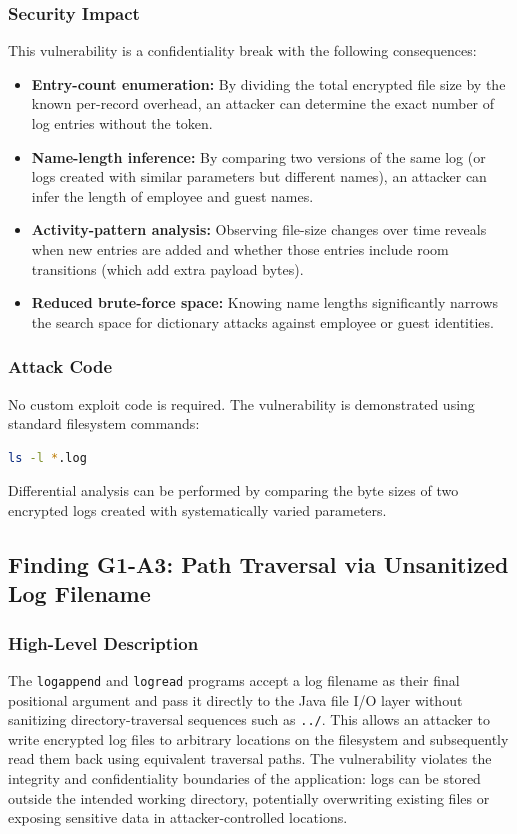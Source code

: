 \documentclass[a4paper, 12pt]{article}
\begin{document}
    \subsubsection{Security Impact}
    This vulnerability is a confidentiality break with the following consequences:
    \begin{itemize}
        \item \textbf{Entry-count enumeration:} By dividing the total encrypted file size by the known per-record overhead, an attacker can determine the exact number of log entries without the token.
        \item \textbf{Name-length inference:} By comparing two versions of the same log (or logs created with similar parameters but different names), an attacker can infer the length of employee and guest names.
        \item \textbf{Activity-pattern analysis:} Observing file-size changes over time reveals when new entries are added and whether those entries include room transitions (which add extra payload bytes).
        \item \textbf{Reduced brute-force space:} Knowing name lengths significantly narrows the search space for dictionary attacks against employee or guest identities.
    \end{itemize}

    \subsubsection{Attack Code}
    No custom exploit code is required. The vulnerability is demonstrated using standard filesystem commands:
    \begin{lstlisting}[language=bash]
ls -l *.log
    \end{lstlisting}
    Differential analysis can be performed by comparing the byte sizes of two encrypted logs created with systematically varied parameters.

    \subsection{Finding G1-A3: Path Traversal via Unsanitized Log Filename}
    \subsubsection{High-Level Description}
    The \texttt{logappend} and \texttt{logread} programs accept a log filename as their final positional argument and pass it directly to the Java file I/O layer without sanitizing directory-traversal sequences such as \texttt{../}. This allows an attacker to write encrypted log files to arbitrary locations on the filesystem and subsequently read them back using equivalent traversal paths. The vulnerability violates the integrity and confidentiality boundaries of the application: logs can be stored outside the intended working directory, potentially overwriting existing files or exposing sensitive data in attacker-controlled locations.
\end{document}
